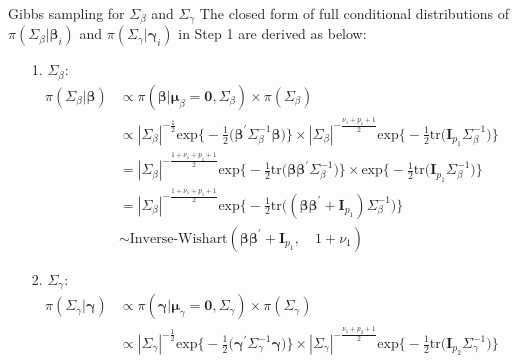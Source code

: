 \documentclass[a4paper, 12pt]{article}
\makeatletter
\renewcommand{\subsection}{\@startsection
	{subsection}    {2}    {0mm}    {-0.5\baselineskip}    {0.01\baselineskip}    {\normalfont\normalsize\itshape\center}}
\makeatother
\begin{document}
\subsection{Gibbs sampling for $\Sigma_{\beta}$ and $\Sigma_{\gamma}$}
\noindent The closed form of full conditional distributions of $\pi(\Sigma_{\beta}|\mathbf{\beta}_i)$ and $\pi(\Sigma_{\gamma}|\mathbf{\gamma}_i)$ in Step 1 are derived as below:
	\begin{itemize}
		\item [1.] $\Sigma_{\beta}$:
		\begin{equation*}
		\begin{aligned}
		\pi(\Sigma_{\beta}|\mathbf{\beta}) 	&\propto \pi(\mathbf{\beta}|\mathbf{\mu}_{\beta} = \mathbf{0}, \Sigma_{\beta}) \times \pi(\Sigma_{\beta}) \\
		&\propto |\Sigma_{\beta}|^{-\frac{1}{2}}\mbox{exp}\Big\{-\frac{1}{2}\Big(\mathbf{\beta}^\prime \Sigma_{\beta}^{-1}\mathbf{\beta}\Big)\Big\}\times |\Sigma_{\beta}|^{-\frac{\nu_1 + p_1 + 1}{2}}\mbox{exp}\Big\{-\frac{1}{2}\mbox{tr}\Big(\mathbf{I}_{p_1}\Sigma_{\beta}^{-1}\Big)\Big\}\\
		& = |\Sigma_{\beta}|^{-\frac{1 + \nu_1 + p_1 +1}{2}}\mbox{exp}\Big\{-\frac{1}{2}\mbox{tr}\Big(\mathbf{\beta}\mathbf{\beta}^\prime \Sigma_{\beta}^{-1}\Big)\Big\}\times \mbox{exp}\Big\{-\frac{1}{2}\mbox{tr}\Big(\mathbf{I}_{p_1}\Sigma_{\beta}^{-1}\Big)\Big\}\\
		& = |\Sigma_{\beta}|^{-\frac{1 + \nu_1 + p_1 +1}{2}}\mbox{exp}\Big\{-\frac{1}{2}\mbox{tr}\Big((\mathbf{\beta}\mathbf{\beta}^\prime + \mathbf{I}_{p_1})\Sigma_{\beta}^{-1}\Big) \Big\}\\
		&\sim \mbox{Inverse-Wishart}(\mathbf{\beta}\mathbf{\beta}^\prime + \mathbf{I}_{p_1},\quad 1 + \nu_1)	
		\end{aligned}
		\end{equation*} 
		\item [2.] $\Sigma_{\gamma}$:
		\begin{equation*}
		\begin{aligned}
		\pi(\Sigma_{\gamma}|\mathbf{\gamma}) 	&\propto \pi(\mathbf{\gamma}|\mathbf{\mu}_{\gamma} = \mathbf{0}, \Sigma_{\gamma}) \times \pi(\Sigma_{\gamma}) \\
		&\propto |\Sigma_{\gamma}|^{-\frac{1}{2}}\mbox{exp}\Big\{-\frac{1}{2}\Big(\mathbf{\gamma}^\prime \Sigma_{\gamma}^{-1}\mathbf{\gamma}\Big)\Big\}\times |\Sigma_{\gamma}|^{-\frac{\nu_1 + p_2 + 1}{2}}\mbox{exp}\Big\{-\frac{1}{2}\mbox{tr}\Big(\mathbf{I}_{p_2}\Sigma_{\gamma}^{-1}\Big)\Big\}\\

\end{aligned}
\end{equation*}
\end{itemize}
\end{document}
